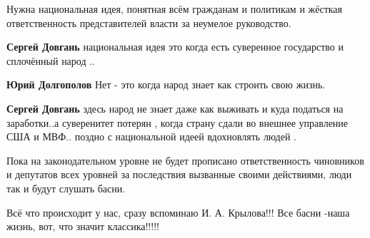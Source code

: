 \begin{itemize}
Нужна национальная идея, понятная всём гражданам и политикам и жёсткая
ответственность представителей власти за неумелое руководство.

\begin{itemize}
 
\textbf{Сергей Довгань} национальная идея это когда есть суверенное государство и сплочённый народ ..

 
\textbf{Юрий Долгополов} Нет - это когда народ знает как строить свою жизнь.

 
\textbf{Сергей Довгань} здесь народ не знает даже как выживать и куда податься на заработки..а суверенитет потерян , когда страну сдали во внешнее управление США и МВФ.. поздно с национальной идеей вдохновлять людей .
\end{itemize}

 

Пока на законодательном уровне не будет прописано ответственность чиновников и
депутатов всех уровней за последствия вызванные своими действиями, люди так и
будут слушать басни.


 
Всё что происходит у нас, сразу вспоминаю И. А. Крылова!!! Все басни -наша жизнь, вот, что значит классика!!!!!

 


\end{itemize}
